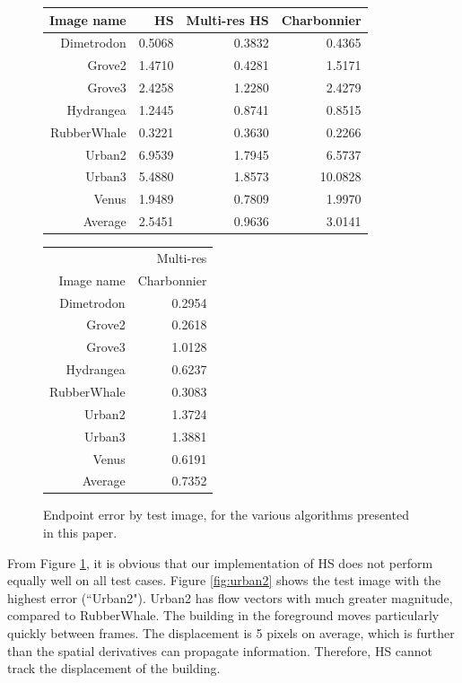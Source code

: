 \documentclass[10pt,twocolumn,letterpaper]{article}
\begin{document}
\begin{figure}
\begin{tabular} {|r | r | r| r |}
\hline
Image name & HS & Multi-res HS & Charbonnier \\
\hline 
Dimetrodon & 0.5068 &  0.3832 & 0.4365 \\
Grove2 & 1.4710 & 0.4281 & 1.5171\\
Grove3 &  2.4258 & 1.2280 & 2.4279\\
Hydrangea & 1.2445 & 0.8741 & 0.8515\\
RubberWhale & 0.3221 & 0.3630 & 0.2266\\
Urban2 & 6.9539 & 1.7945 & 6.5737\\
Urban3 & 5.4880 & 1.8573 & 10.0828\\
Venus & 1.9489 & 0.7809 & 1.9970\\
\hline
Average & 2.5451 & 0.9636 & 3.0141 \\
\hline

\end{tabular}
\begin{tabular} {|r | r |}
\hline
& Multi-res \\
Image name &  Charbonnier \\
\hline 
Dimetrodon & 0.2954 \\
Grove2 & 0.2618 \\
Grove3 & 1.0128 \\
Hydrangea & 0.6237   \\
RubberWhale & 0.3083 \\
Urban2 & 1.3724 \\
Urban3 & 1.3881 \\
Venus & 0.6191 \\
\hline
Average & 0.7352\\
\hline


\end{tabular}

\caption{Endpoint error by test image, for the various algorithms presented in this paper.}
\label{fig:table}
\end{figure}

From Figure \ref{fig:table}, it is obvious that our implementation of HS does not perform equally well on all test cases.  Figure \ref{fig:urban2} shows the test image with the highest error (``Urban2").  Urban2 has flow vectors with much greater magnitude, compared to RubberWhale.  The building in the foreground moves particularly quickly between frames.  The displacement is 5 pixels on average, which is further than the spatial derivatives can propagate information.  Therefore, HS cannot track the displacement of the building.  
\end{document}
